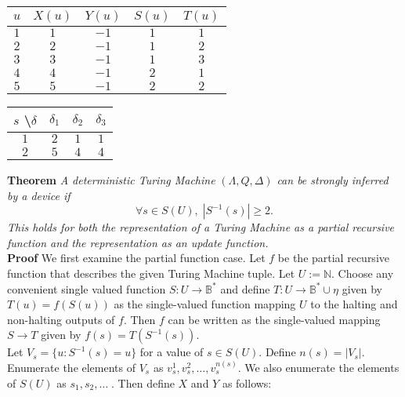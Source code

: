 \documentclass[11pt]{article}
\newcommand{\N}{\mathbb{N}}
\newcommand{\B}{\mathbb{B}}
\begin{document}
 \begin{center}
 \begin{tabular}{ |c||c|c|c|c| } 

 \hline
 $ u $ & $ X(u) $ & $ Y(u) $ & $ S(u) $ & $ T(u) $ \\ 
 \hline
 \hline
 $ 1 $ & $ 1 $ & $ -1 $ & $ 1 $ & $ 1 $ \\
 \hline
 $ 2 $ & $ 2 $ & $ -1 $ & $ 1 $ & $ 2 $ \\
 \hline
 $ 3 $ & $ 3 $ & $ -1 $ & $ 1 $ & $ 3 $ \\
 \hline
 $ 4 $ & $ 4 $ & $ -1 $ & $ 2 $ & $ 1 $ \\
 \hline
 $ 5 $ & $ 5 $ & $ -1 $ & $ 2 $ & $ 2 $ \\
 \hline
 \end{tabular} 
 \quad
 \begin{tabular}{ |c||c|c|c| } 

 \hline
 $ s $ \textbackslash $ \delta $ & $ \delta_1 $ & $ \delta_2 $ & $ \delta_3 $ \\ 
 \hline
 \hline
 $ 1 $ & $ 2 $ & $ 1 $ & $ 1 $  \\
  \hline
 $ 2 $ & $ 5 $ & $ 4 $ & $ 4 $  \\
 \hline
 
 \end{tabular}
 \end{center} 


\bigskip 
\bigskip
\textbf{Theorem} \quad \textit{A deterministic Turing Machine} $(\Lambda, Q, \Delta)$ \textit{can be strongly inferred by a device if} 
$$\forall s \in S(U),\; |S^{-1}(s)| \geq 2. $$ \textit{This holds for both the representation of a Turing Machine as a partial recursive function and the representation as an update function.} \\

\textbf{Proof} \quad We first examine the partial function case. Let $ f $ be the partial recursive function that describes the given Turing Machine tuple. Let $ U := \N $. Choose any convenient single valued function $ S: U \rightarrow \B^{*} $ and define $ T: U \rightarrow \B^{*} \cup \eta$ given by $T(u) = f(S(u)) $ as the single-valued function mapping $ U $ to the halting and non-halting outputs of $ f $. Then $ f $ can be written as the single-valued mapping $ S \rightarrow T $ given by $ f(s) = T(S^{-1}(s)) $. \\


Let $ V_s = \{u : S^{-1}(s) = u \} $ for a value of $ s \in S(U) $. Define $ n(s) = |V_s| $. Enumerate the elements of $ V_s $ as $v_{s}^1, v_{s}^2, \dots , v_{s}^{n(s)}$. We also enumerate the elements of $ S(U) $ as $ s_1, s_2, \dots \; $. Then define $ X $ and $ Y $ as follows:
\end{document}
